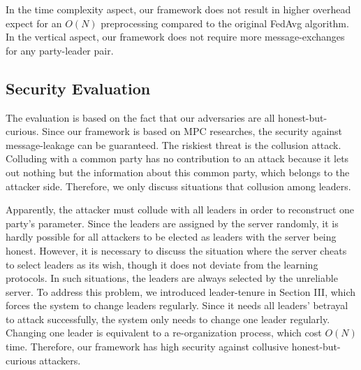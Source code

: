 In the time complexity aspect, our framework does not result in higher overhead expect for an $O(N)$ preprocessing compared to the original FedAvg algorithm. In the vertical aspect, our framework does not require more message-exchanges for any party-leader pair. 

\subsection{Security Evaluation}
The evaluation is based on the fact that our adversaries are all honest-but-curious. Since our framework is based on MPC researches\cite{Shamir,Du2001SecureMC,Three-Party}, the security against message-leakage can be guaranteed. The riskiest threat is the collusion attack. Colluding with a common party has no contribution to an attack because it lets out nothing but the information about this common party, which belongs to the attacker side. Therefore, we only discuss situations that collusion among leaders. 

Apparently, the attacker must collude with all leaders in order to reconstruct one party's parameter. Since the leaders are assigned by the server randomly, it is hardly possible for all attackers to be elected as leaders with the server being honest. However, it is necessary to discuss the situation where the server cheats to select leaders as its wish, though it does not deviate from the learning protocols. In such situations, the leaders are always selected by the unreliable server. To address this problem, we introduced leader-tenure in Section III, which forces the system to change leaders regularly. Since it needs all leaders' betrayal to attack successfully, the system only needs to change one leader regularly. Changing one leader is equivalent to a re-organization process, which cost $O(N)$ time. Therefore, our framework has high security against collusive honest-but-curious attackers.
